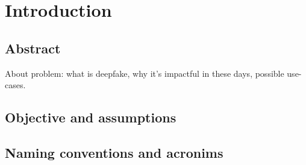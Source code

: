 \chapter{Introduction}
\section{Abstract}
About problem: what is deepfake, why it's impactful in these days, possible use-cases.

\section{Objective and assumptions}
\section{Naming conventions and acronims}

